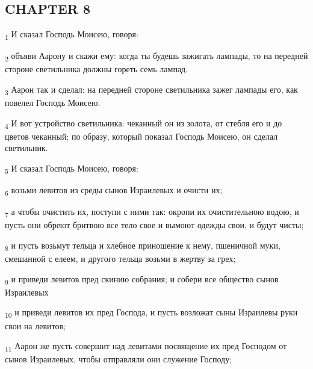 \subsection{CHAPTER 8}
\begin{tcolorbox}
\textsubscript{1} И сказал Господь Моисею, говоря:
\end{tcolorbox}
\begin{tcolorbox}
\textsubscript{2} объяви Аарону и скажи ему: когда ты будешь зажигать лампады, то на передней стороне светильника должны гореть семь лампад.
\end{tcolorbox}
\begin{tcolorbox}
\textsubscript{3} Аарон так и сделал: на передней стороне светильника зажег лампады его, как повелел Господь Моисею.
\end{tcolorbox}
\begin{tcolorbox}
\textsubscript{4} И вот устройство светильника: чеканный он из золота, от стебля его и до цветов чеканный; по образу, который показал Господь Моисею, он сделал светильник.
\end{tcolorbox}
\begin{tcolorbox}
\textsubscript{5} И сказал Господь Моисею, говоря:
\end{tcolorbox}
\begin{tcolorbox}
\textsubscript{6} возьми левитов из среды сынов Израилевых и очисти их;
\end{tcolorbox}
\begin{tcolorbox}
\textsubscript{7} а чтобы очистить их, поступи с ними так: окропи их очистительною водою, и пусть они обреют бритвою все тело свое и вымоют одежды свои, и будут чисты;
\end{tcolorbox}
\begin{tcolorbox}
\textsubscript{8} и пусть возьмут тельца и хлебное приношение к нему, пшеничной муки, смешанной с елеем, и другого тельца возьми в жертву за грех;
\end{tcolorbox}
\begin{tcolorbox}
\textsubscript{9} и приведи левитов пред скинию собрания; и собери все общество сынов Израилевых
\end{tcolorbox}
\begin{tcolorbox}
\textsubscript{10} и приведи левитов их пред Господа, и пусть возложат сыны Израилевы руки свои на левитов;
\end{tcolorbox}
\begin{tcolorbox}
\textsubscript{11} Аарон же пусть совершит над левитами посвящение их пред Господом от сынов Израилевых, чтобы отправляли они служение Господу;
\end{tcolorbox}
